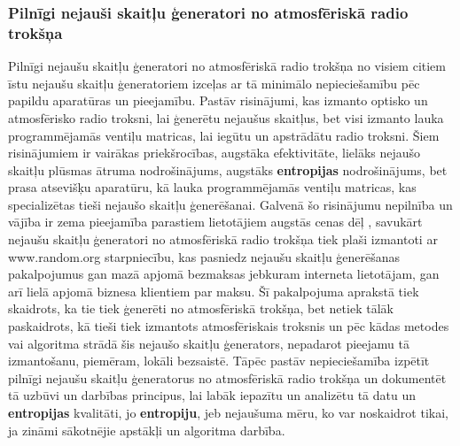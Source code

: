 \documentclass[12pt]{article}
\begin{document}
\subsubsection{Pilnīgi nejauši skaitļu ģeneratori no atmosfēriskā radio trokšņa}
    Pilnīgi nejaušu skaitļu ģeneratori no atmosfēriskā radio trokšņa no visiem citiem īstu nejaušu skaitļu ģeneratoriem izceļas ar tā minimālo nepieciešamību pēc papildu aparatūras un pieejamību. Pastāv risinājumi, kas izmanto optisko un atmosfērisko radio troksni, lai ģenerētu nejaušus skaitļus, bet visi izmanto lauka programmējamās ventiļu matricas, lai iegūtu un apstrādātu radio troksni. \parencite{Opto-radio} Šiem risinājumiem ir vairākas priekšrocības, augstāka efektivitāte, lielāks nejaušo skaitļu plūsmas ātruma nodrošinājums, augstāks \textbf{entropijas} nodrošinājums, bet prasa atsevišķu aparatūru, kā lauka programmējamās ventiļu matricas, kas specializētas tieši nejaušo skaitļu ģenerēšanai. Galvenā šo risinājumu nepilnība un vājība ir zema pieejamība parastiem lietotājiem augstās cenas dēļ \parencite{produkts_dargs}, savukārt nejaušu skaitļu ģeneratori no atmosfēriskā radio trokšņa tiek plaši izmantoti ar \cite{randomorg}www.random.org starpniecību, kas pasniedz nejaušu skaitļu ģenerēšanas pakalpojumus gan mazā apjomā bezmaksas jebkuram interneta lietotājam, gan arī lielā apjomā biznesa klientiem par maksu. Šī pakalpojuma aprakstā tiek skaidrots, ka tie tiek ģenerēti no atmosfēriskā trokšņa, bet netiek tālāk paskaidrots, kā tieši tiek izmantots atmosfēriskais troksnis un pēc kādas metodes vai algoritma strādā šis nejaušo skaitļu ģenerators, nepadarot pieejamu tā izmantošanu, piemēram, lokāli bezsaistē. Tāpēc pastāv nepieciešamība izpētīt pilnīgi nejaušu skaitļu ģeneratorus no atmosfēriskā radio trokšņa un dokumentēt tā uzbūvi un darbības principus, lai labāk iepazītu un analizētu tā datu un \textbf{entropijas} kvalitāti, jo \textbf{entropiju}, jeb nejaušuma mēru, ko var noskaidrot tikai, ja zināmi sākotnējie apstākļi un algoritma darbība.  
    

    
    
\end{document}
